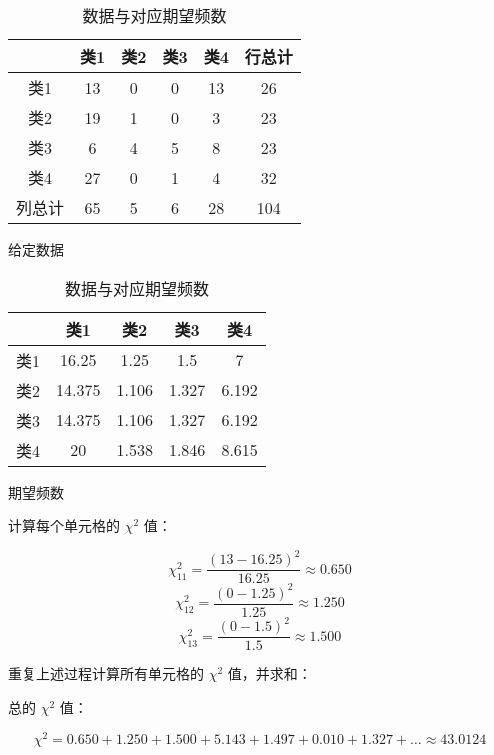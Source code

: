 \documentclass[withoutpreface,bwprint]{cumcmthesis} %
\begin{document}
\begin{table}[htbp]
    \centering
    \begin{subtable}{0.45\textwidth}
        \centering
        \begin{tabular}{|c|c|c|c|c|c|}
            \hline
            & 类1 & 类2 & 类3 & 类4 & 行总计 \\
            \hline
            类1 & 13 & 0 & 0 & 13 & 26 \\
            \hline
            类2 & 19 & 1 & 0 & 3 & 23 \\
            \hline
            类3 & 6 & 4 & 5 & 8 & 23 \\
            \hline
            类4 & 27 & 0 & 1 & 4 & 32 \\
            \hline
            列总计 & 65 & 5 & 6 & 28 & 104 \\
            \hline
        \end{tabular}
        \caption{给定数据}
        \label{tab:data}
    \end{subtable}
    \hfill
    \begin{subtable}{0.45\textwidth}
        \centering
        \begin{tabular}{|c|c|c|c|c|}
            \hline
            & 类1 & 类2 & 类3 & 类4 \\
            \hline
            类1 & 16.25 & 1.25 & 1.5 & 7 \\
            \hline
            类2 & 14.375 & 1.106 & 1.327 & 6.192 \\
            \hline
            类3 & 14.375 & 1.106 & 1.327 & 6.192 \\
            \hline
            类4 & 20 & 1.538 & 1.846 & 8.615 \\
            \hline
        \end{tabular}
        \caption{期望频数}
        \label{tab:expected}
    \end{subtable}
    \caption{数据与对应期望频数}
    \label{tab:both_tables}
\end{table}


计算每个单元格的 \(\chi^2\) 值：

\[
\chi^2_{11} = \frac{(13 - 16.25)^2}{16.25} \approx 0.650
\]
\[
\chi^2_{12} = \frac{(0 - 1.25)^2}{1.25} \approx 1.250
\]
\[
\chi^2_{13} = \frac{(0 - 1.5)^2}{1.5} \approx 1.500
\]

重复上述过程计算所有单元格的 \(\chi^2\) 值，并求和：

总的 \(\chi^2\) 值：

\[
\chi^2 = 0.650 + 1.250 + 1.500 + 5.143 + 1.497 + 0.010 + 1.327 + \ldots \approx 43.0124
\]
\end{document}
